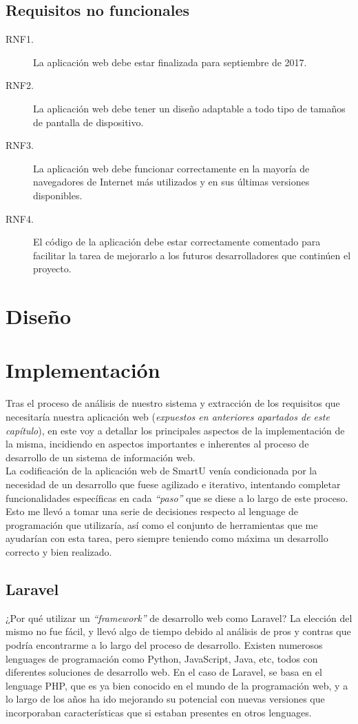 \subsection*{Requisitos no funcionales}
\begin{description}
    \item[RNF1.] La aplicación web debe estar finalizada para septiembre de 2017.
    \item[RNF2.] La aplicación web debe tener un diseño adaptable a todo tipo de tamaños de pantalla de dispositivo.
    \item[RNF3.] La aplicación web debe funcionar correctamente en la mayoría de navegadores de Internet más utilizados y en sus últimas versiones disponibles.
    \item[RNF4.] El código de la aplicación debe estar correctamente comentado para facilitar la tarea de mejorarlo a los futuros desarrolladores que continúen el proyecto.
\end{description}

\section{Diseño}


\section{Implementación}
Tras el proceso de análisis de nuestro sistema y extracción de los requisitos que necesitaría nuestra aplicación web (\textit{expuestos en anteriores apartados de este capítulo}), en este voy a detallar los principales aspectos de la implementación de la misma, incidiendo en aspectos importantes e inherentes al proceso de desarrollo de un sistema de información web.\\

La codificación de la aplicación web de SmartU venía condicionada por la necesidad de un desarrollo que fuese agilizado e iterativo, intentando completar funcionalidades específicas en cada \textit{``paso''} que se diese a lo largo de este proceso. Esto me llevó a tomar una serie de decisiones respecto al lenguage de programación que utilizaría, así como el conjunto de herramientas que me ayudarían con esta tarea, pero siempre teniendo como máxima un desarrollo correcto y bien realizado.

\subsection{Laravel}
¿Por qué utilizar un \textit{``framework''} de desarrollo web como Laravel? La elección del mismo no fue fácil, y llevó algo de tiempo debido al análisis de pros y contras que podría encontrarme a lo largo del proceso de desarrollo. Existen numerosos lenguages de programación como Python, JavaScript, Java, etc, todos con diferentes soluciones de desarrollo web. En el caso de Laravel, se basa en el lenguage PHP, que es ya bien conocido en el mundo de la programación web, y a lo largo de los años ha ido mejorando su potencial con nuevas versiones que incorporaban características que si estaban presentes en otros lenguages.\\

